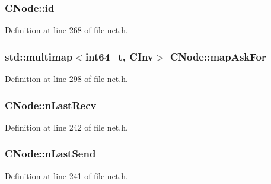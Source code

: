 \hypertarget{class_c_node_af99591c635f495fc1e6c14745a2a4203}{}
\subsubsection[{id}]{ C\+Node\+::id}\label{class_c_node_af99591c635f495fc1e6c14745a2a4203}


Definition at line 268 of file net.\+h.

\hypertarget{class_c_node_a7593dfbd76c34a81169e3fb2aa0e0cf7}{}
\subsubsection[{map\+Ask\+For}]{\setlength{\rightskip}{0pt plus 5cm}std\+::multimap$<${\bf int64\+\_\+t}, {\bf C\+Inv}$>$ C\+Node\+::map\+Ask\+For}\label{class_c_node_a7593dfbd76c34a81169e3fb2aa0e0cf7}


Definition at line 298 of file net.\+h.

\hypertarget{class_c_node_afb40f43a51ba686de93256727351af07}{}
\subsubsection[{n\+Last\+Recv}]{ C\+Node\+::n\+Last\+Recv}\label{class_c_node_afb40f43a51ba686de93256727351af07}


Definition at line 242 of file net.\+h.

\hypertarget{class_c_node_af39253ad525733ca64ab3fc785dfc4eb}{}
\subsubsection[{n\+Last\+Send}]{ C\+Node\+::n\+Last\+Send}\label{class_c_node_af39253ad525733ca64ab3fc785dfc4eb}


Definition at line 241 of file net.\+h.

\hypertarget{class_c_node_a442ac1857129bccaea4642d23d94ee58}{}
